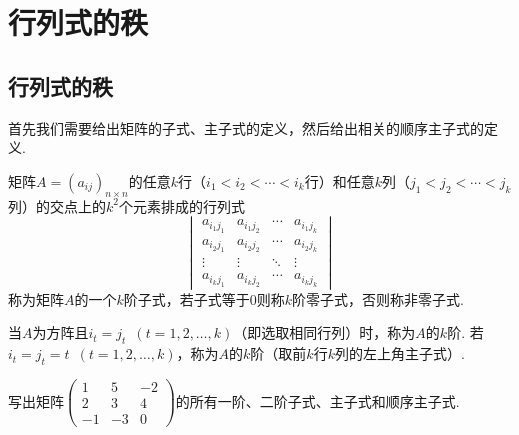 \section{行列式的秩}

\subsection{行列式的秩}

首先我们需要给出矩阵的子式、主子式的定义，然后给出相关的顺序主子式的定义.
\begin{definition}{}{}
    矩阵$A=(a_{ij})_{n \times n}$的任意$k$行（$i_1<i_2<\cdots<i_k$行）和任意$k$列（$j_1<j_2<\cdots<j_k$列）的交点上的$k^2$个元素排成的行列式
    \[\begin{vmatrix}
            a_{i_1j_1} & a_{i_1j_2} & \cdots & a_{i_1j_k} \\
            a_{i_2j_1} & a_{i_2j_2} & \cdots & a_{i_2j_k} \\
            \vdots     & \vdots     & \ddots & \vdots     \\
            a_{i_kj_1} & a_{i_kj_2} & \cdots & a_{i_kj_k}
        \end{vmatrix}\]
    称为矩阵$A$的一个$k$阶子式，若子式等于0则称$k$阶零子式，否则称非零子式.

    当$A$为方阵且$i_t=j_t\enspace(t=1,2,\ldots,k)$（即选取相同行列）时，称为$A$的$k$阶. 若$i_t=j_t=t\enspace(t=1,2,\ldots,k)$，称为$A$的$k$阶（取前$k$行$k$列的左上角主子式）.
\end{definition}

\begin{example}{}{}
    写出矩阵$\begin{pmatrix}
            1 & 5 & -2 \\ 2 & 3 & 4 \\ -1 & -3 & 0
        \end{pmatrix}$的所有一阶、二阶子式、主子式和顺序主子式.
\end{example}


